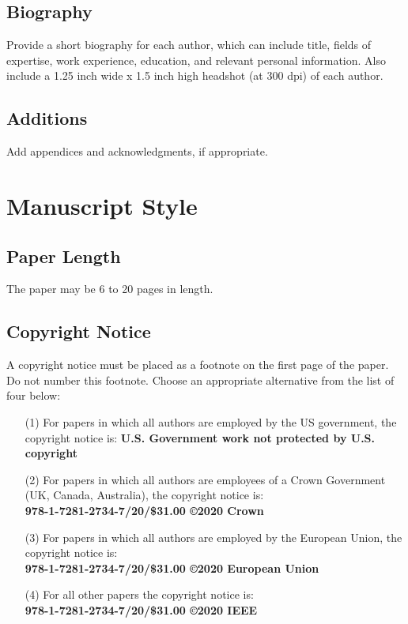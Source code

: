 \documentclass[twocolumn,letterpaper]{IEEEAerospaceCLS}  %
\begin{document}
\subsection{Biography}
Provide a short biography for each author, which can include title, fields of expertise, work experience, education, and relevant personal information. Also include a 1.25 inch wide x 1.5 inch high headshot (at 300 dpi) of each author.

\subsection{Additions}
Add appendices and acknowledgments, if appropriate.



\section{Manuscript Style}

\subsection{Paper Length}
The paper may be 6 to 20 pages in length.

\subsection{Copyright Notice}
A copyright notice must be placed as a footnote on the first page of the paper. Do not number this footnote. Choose an appropriate alternative from the list of four below:
\begin{itemize}
  \item [(1)] For papers in which all authors are employed by the US government, the copyright notice is: \textbf {U.S. Government work not protected by U.S. copyright} \\
  \item [(2)] For papers in which all authors are employees of a Crown Government (UK, Canada, Australia), the copyright notice is: \\{\bf 978-1-7281-2734-7/20/\$31.00 \copyright2020 Crown}\\
  \item [(3)] For papers in which all authors are employed by the European Union, the copyright notice is: \\{\bf 978-1-7281-2734-7/20/\$31.00 \copyright2020 European Union}\\
  \item [(4)]  For all other papers the copyright notice is: \\{\bf  978-1-7281-2734-7/20/\$31.00 \copyright2020 IEEE}
\end{itemize}
\end{document}
